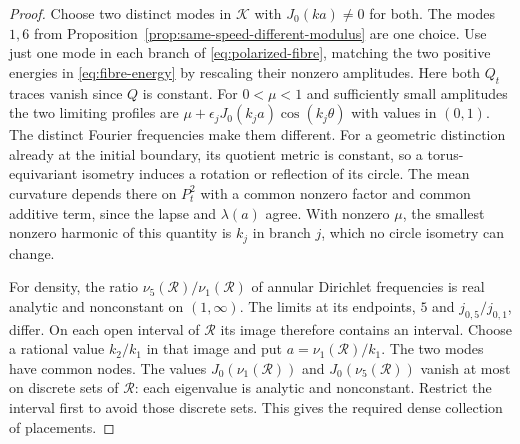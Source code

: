 \begin{proof}
Choose two distinct modes in $\mathcal K$ with
$J_0(k a)\ne0$ for both. The modes $1,6$
from Proposition~\ref{prop:same-speed-different-modulus}
are one choice.
Use just one mode in each branch of
\eqref{eq:polarized-fibre}, matching the two
positive energies in \eqref{eq:fibre-energy}
by rescaling their nonzero amplitudes.
Here both $Q_t$ traces vanish since $Q$ is
constant. For $0<\mu<1$ and sufficiently
small amplitudes the two limiting profiles are
$\mu+\epsilon_j J_0(k_j a)\cos(k_j\theta)$
with values in $(0,1)$.
The distinct Fourier frequencies make them different.
For a geometric distinction already at the initial
boundary, its quotient metric is constant, so a
torus-equivariant isometry induces a rotation or
reflection of its circle. The mean curvature
depends there on $P_t^2$ with a common nonzero
factor and common additive term, since the
lapse and $\lambda(a)$ agree.
With nonzero $\mu$, the smallest nonzero harmonic
of this quantity is $k_j$ in branch $j$,
which no circle isometry can change.

For density, the ratio $\nu_5(\mathcal R)/
\nu_1(\mathcal R)$ of annular Dirichlet frequencies
is real analytic and nonconstant on $(1,\infty)$.
The limits at its endpoints, $5$ and
$j_{0,5}/j_{0,1}$, differ.
On each open interval of $\mathcal R$ its image
therefore contains an interval.
Choose a rational value $k_2/k_1$ in that image
and put $a=\nu_1(\mathcal R)/k_1$.
The two modes have common nodes.
The values $J_0(\nu_1(\mathcal R))$ and
$J_0(\nu_5(\mathcal R))$ vanish at most on
discrete sets of $\mathcal R$: each eigenvalue
is analytic and nonconstant.
Restrict the interval first to avoid those
discrete sets. This gives the required dense
collection of placements.
\end{proof}
